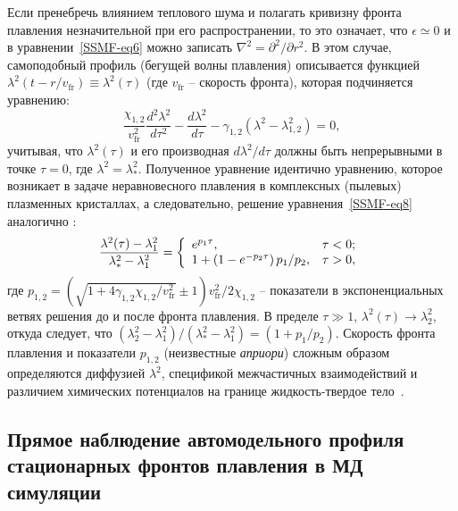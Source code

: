 Если пренебречь влиянием теплового шума и полагать кривизну фронта плавления незначительной при его распространении, то это означает, что $ \epsilon \simeq 0 $ и в уравнении~\eqref{SSMF-eq6} можно записать $ \nabla ^ 2 = \partial ^ 2 / \partial r ^ 2 $.
В этом случае, самоподобный профиль (бегущей волны плавления) описывается функцией $\lambda^2(t-r/v_\mathrm{fr})\equiv \lambda^2(\tau)$ (где $v_\mathrm{fr}$ -- скорость фронта), которая подчиняется уравнению:
\begin{equation}
\label{SSMF-eq8}
\frac{\chi_{1,2}}{v_{\mathrm{fr}}^2} \frac{d^2 \lambda^2}{d\tau^2} -\frac{d \lambda^2}{d \tau} -\gamma_{1,2}(\lambda^2-\lambda_{1,2}^2) =0,
\end{equation}
учитывая, что $\lambda^2(\tau) $ и его производная $ d\lambda^2/ d \tau $ должны быть непрерывными в точке $ \tau = 0 $, где $\lambda^2=\lambda_\ast^2$.
Полученное уравнение идентично уравнению, которое возникает в задаче неравновесного плавления в комплексных (пылевых) плазменных кристаллах, а следовательно, решение уравнения~\eqref{SSMF-eq8} аналогично \cite{10.1103/physreve.96.043201, 10.1103/physreve.100.023203}:
\begin{equation}
\label{SSMF-eq9}
\frac{\lambda^2(\tau)-\lambda^2_1}{\lambda^2_\ast-\lambda^2_1}=
\left\{
  \begin{array}{ll}
    e^{p_1 \tau}, & \tau < 0;\\
   1+\left(1-e^{-p_2\tau}\right)p_1/p_2 , & \tau > 0,\\
  \end{array}
\right. \\
\end{equation}
где $ p_{1,2} = \left(\sqrt {1 + 4 \gamma_{1,2} \chi_{1,2} / v_\mathrm{fr} ^ 2} \pm 1 \right) v_\mathrm{fr} ^ 2/2 \chi_{1,2} $ -- показатели в экспоненциальных ветвях решения до и после фронта плавления.
В пределе $\tau \gg 1$, $\lambda^2(\tau) \rightarrow \lambda_2^2$, откуда следует, что
$\left(\lambda_2^2-\lambda^2_1\right)/\left(\lambda^2_\ast-\lambda^2_1\right) = (1+p_1/p_2)$.
Скорость фронта плавления и показатели $p_{1,2} $ (неизвестные \emph{априори}) сложным образом определяются диффузией $\lambda^2$, спецификой межчастичных взаимодействий и различием химических потенциалов на границе жидкость-твердое тело~\cite{10.1038/ncomms7942}.


\subsection{Прямое наблюдение автомодельного профиля стационарных фронтов плавления в МД симуляции}
\label{SSMF-Results-MD}

